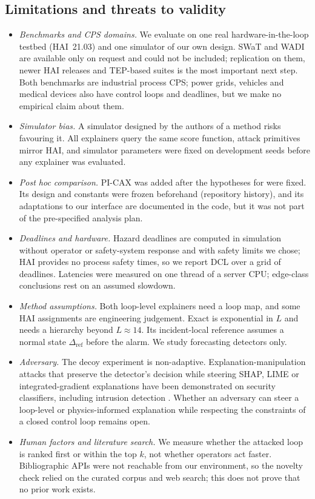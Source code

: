 \subsection{Limitations and threats to validity}\label{sec:limitations}
\begin{itemize}
\item \emph{Benchmarks and CPS domains.} We evaluate on one real hardware-in-the-loop testbed (HAI~21.03) and one simulator of our own design. SWaT and WADI are available only on request and could not be included; replication on them, newer HAI releases and TEP-based suites \citep{fung2024attributions} is the most important next step. Both benchmarks are industrial process CPS; power grids, vehicles and medical devices also have control loops and deadlines, but we make no empirical claim about them.
\item \emph{Simulator bias.} A simulator designed by the authors of a method risks favouring it. All explainers query the same score function, attack primitives mirror HAI, and simulator parameters were fixed on development seeds before any explainer was evaluated.
\item \emph{Post hoc comparison.} PI-CAX was added after the hypotheses for \LX{} were fixed. Its design and constants were frozen beforehand (repository history), and its adaptations to our interface are documented in the code, but it was not part of the pre-specified analysis plan.
\item \emph{Deadlines and hardware.} Hazard deadlines are computed in simulation without operator or safety-system response and with safety limits we chose; HAI provides no process safety times, so we report DCL over a grid of deadlines. Latencies were measured on one thread of a server CPU; edge-class conclusions rest on an assumed slowdown.
\item \emph{Method assumptions.} Both loop-level explainers need a loop map, and some HAI assignments are engineering judgement. Exact \LX{} is exponential in $L$ and needs a hierarchy beyond $L\approx14$. Its incident-local reference assumes a normal state $\Delta_{\mathrm{ref}}$ before the alarm. We study forecasting detectors only.
\item \emph{Adversary.} The decoy experiment is non-adaptive. Explanation-manipulation attacks that preserve the detector's decision while steering SHAP, LIME or integrated-gradient explanations have been demonstrated on security classifiers, including intrusion detection \citep{slack2020fooling,mia2025vulnerable}. Whether an adversary can steer a loop-level or physics-informed explanation while respecting the constraints of a closed control loop remains open.
\item \emph{Human factors and literature search.} We measure whether the attacked loop is ranked first or within the top $k$, not whether operators act faster. Bibliographic APIs were not reachable from our environment, so the novelty check relied on the curated corpus and web search; this does not prove that no prior work exists.
\end{itemize}

